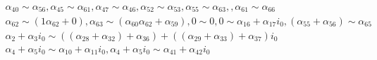 {
\tiny

\begin{align*}
    \alpha_{40} \sim \alpha_{56}, \alpha_{45} \sim \alpha_{61}, \alpha_{47} \sim \alpha_{46}, \alpha_{52} \sim \alpha_{53}, \alpha_{55} \sim \alpha_{63},, \alpha_{61} \sim \alpha_{66}\\ \alpha_{62} \sim (1\alpha_{62}+0), \alpha_{63} \sim (\alpha_{60}\alpha_{62}+\alpha_{59}), 0 \sim 0, 0 \sim \alpha_{16} + \alpha_{17}i_{0},
    (\alpha_{55}+\alpha_{56}) \sim \alpha_{65}\\
    \alpha_{2} + \alpha_{3}i_{0} \sim ((\alpha_{28}+\alpha_{32})+\alpha_{36}) + ((\alpha_{29}+\alpha_{33})+\alpha_{37})i_{0}\\
    \alpha_{4} + \alpha_{5}i_{0} \sim \alpha_{10} + \alpha_{11}i_{0}, \alpha_{4} + \alpha_{5}i_{0} \sim \alpha_{41} + \alpha_{42}i_{0}\\

\end{align*}}
